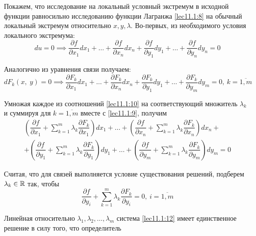 \documentclass[../../main.tex]{subfiles}
\begin{document}
	
	Покажем, что исследование на локальный условный экстремум в исходной 
	функции равносильно исследованию функции Лагранжа 
	\eqref{lec11.1:8} на обычный локальный экстремум относительно $x, y,\lambda$.
	Во-первых, из необходимого условия локального экстремума:
	\begin{equation}
	du = 0 \implies \dfrac{\partial f}{\partial x_1} dx_1 + \ldots + 
	\dfrac{\partial f}{\partial x_n} dx_n + \dfrac{\partial f}{\partial y_1}dy_1
	 + \ldots + \dfrac{\partial f}{\partial y_n} dy_n = 0 \label{lec11.1:9}
	\end{equation}
	
	Аналогично из уравнения связи получаем:
	\begin{equation}
	dF_k\left(x, \; y\right) = 0 \implies \dfrac{\partial 
	F_k}{\partial x_1}dx_1 + 
	\ldots + \dfrac{\partial F_k}{\partial x_n}dx_n + 
	\dfrac{\partial F_k}{\partial y_1}dy_1 + \ldots + 
	\dfrac{\partial F_k}{\partial y_m}dy_m = 0,\ k = \overline{1, m} 
	\label{lec11.1:10}
	\end{equation}
	
	Умножая каждое из соотношений \eqref{lec11.1:10} на соответствующий множитель 
	$\lambda_k$ и суммируя для $k = \overline{1, m}$ 
	вместе с \eqref{lec11.1:9}, получим
	\begin{multline}
	\left(\dfrac{\partial f}{\partial x_1} + \sum\limits_{k
	= 1}^m \lambda_k \dfrac{\partial F_k}{\partial x_1} 
	\right)dx_1 + \ldots + \left(\dfrac{\partial f}
	{\partial x_n} + \sum\limits_{k = 1}^m \lambda_k 
	\dfrac{\partial F_k}{\partial x_n} \right)dx_n + \\ +
	\left(\dfrac{\partial f}{\partial y_1} + 
	\sum\limits_{k = 1}^m \lambda_k \dfrac{\partial F_k}
	{\partial y_1} \right)dy_1 +
	\ldots 
	+ \left(\dfrac{\partial f}{\partial y_m} + 
	\sum\limits_{k = 1}^m \lambda_k \dfrac{\partial F_k}
	{\partial y_m} \right)dy_m = 0 \label{lec11.1:11}
	\end{multline}
	
	Считая, что для связей выполняется условие существования 
	решений, подберем $\lambda_k \in \mathbb{R}$ так, чтобы
	\begin{equation}
	\dfrac{\partial f}{\partial y_i} + \sum\limits_{k = 1}^m \lambda_k 
	\dfrac{\partial F_k}{\partial y_i} = 0,\ i = \overline{1,m} 
	\label{lec11.1:12}
	\end{equation}
	
	Линейная относительно $\lambda_1, \lambda_2, \ldots, \lambda_m$ система 
	\eqref{lec11.1:12} имеет единственное решение в силу того, что определитель
	
\end{document}
